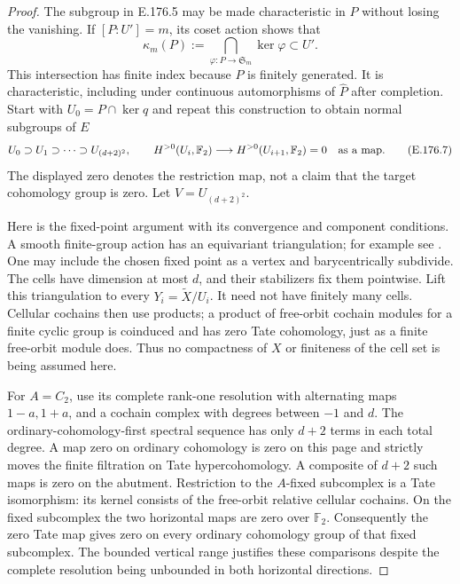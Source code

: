 \begin{proof}
The subgroup in E.176.5 may be made characteristic in \(P\)
without losing the vanishing.  If \([P:U']=m\), its coset
action shows that
\[
 \kappa_m(P):=\bigcap_{\varphi:P\to\mathfrak S_m}\ker\varphi
                              \subset U'.
\tag{E.176.6}
\]
This intersection has finite index because \(P\) is finitely
generated.  It is characteristic, including under continuous
automorphisms of \(\widehat P\) after completion.  Start with
\(U_0=P\cap\ker q\) and repeat this construction to obtain
normal subgroups of \(E\)
\[
 U_0\supset U_1\supset\cdots\supset U_{(d+2)^2},
 \qquad H^{>0}(U_i,\mathbb F_2)
             \longrightarrow H^{>0}(U_{i+1},\mathbb F_2)=0
             \quad\hbox{as a map}.
\tag{E.176.7}
\]
The displayed zero denotes the restriction map, not a
claim that the target cohomology group is zero.
Let \(V=U_{(d+2)^2}\).

Here is the fixed-point argument with its convergence
and component conditions.  A smooth finite-group action
has an equivariant triangulation; for example see
\cite[opening Theorem, part 1, p.199; conventions, p.201]{LitIllman1978}.
One may include the chosen fixed point as a vertex and
barycentrically subdivide.  The cells have dimension at
most \(d\), and their stabilizers fix them pointwise.
Lift this triangulation to every \(Y_i=\widetilde X/U_i\).
It need not have finitely many cells.  Cellular cochains
then use products; a product of free-orbit cochain modules
for a finite cyclic group is coinduced and has zero Tate
cohomology, just as a finite free-orbit module does.
Thus no compactness of \(X\) or finiteness of the cell
set is being assumed here.

For \(A=C_2\), use its complete rank-one resolution with
alternating maps \(1-a,1+a\), and a cochain complex with
degrees between \(-1\) and \(d\).
The ordinary-cohomology-first spectral sequence has only
\(d+2\) terms in each total degree.  A map zero on ordinary
cohomology is zero on this page and strictly moves the
finite filtration on Tate hypercohomology.  A composite
of \(d+2\) such maps is zero on the abutment.
Restriction to the \(A\)-fixed subcomplex is a Tate
isomorphism: its kernel consists of the free-orbit
relative cellular cochains.  On the fixed subcomplex
the two horizontal maps are zero over \(\mathbb F_2\).
Consequently the zero Tate map gives zero on every
ordinary cohomology group of that fixed subcomplex.
The bounded vertical range justifies these comparisons
despite the complete resolution being unbounded in both
horizontal directions.


\end{proof}
